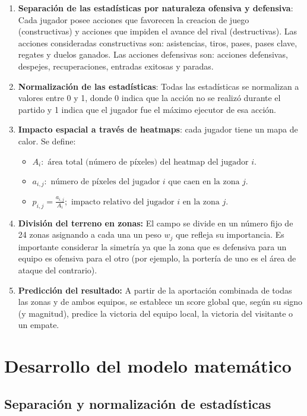 \begin{enumerate}
    \item \textbf{Separación de las estadísticas por naturaleza ofensiva y defensiva}: Cada jugador posee acciones que favorecen la creacion de juego (constructivas) y acciones que impiden el avance del rival (destructivas). Las acciones consideradas constructivas son: asistencias, tiros, pases, pases clave, regates y duelos ganados. Las acciones defensivas son: acciones defensivas, despejes, recuperaciones, entradas exitosas y paradas.
    \item \textbf{Normalización de las estadísticas}: Todas las estadísticas se normalizan a valores entre 0 y 1, donde 0 indica que la acción no se realizó durante el partido y 1 indica que el jugador fue el máximo ejecutor de esa acción.
    \item \textbf{Impacto espacial a través de heatmaps}: cada jugador tiene un mapa de calor. Se define:
    \begin{itemize}
        \item $ A_i: \text{ área total (número de píxeles) del heatmap del jugador } i.$
        \item $ a_{i,j}: \text{ número de píxeles del jugador } i \text{ que caen en la zona } j. $
        \item $ p_{i,j} = \frac{a_{i,j}}{A_i}; \text{ impacto relativo del jugador } i \text{ en la zona } j. $
    \end{itemize} 

    \item \textbf{División del terreno en zonas:} El campo se divide en un número fijo de 24 zonas asignando a cada una un peso $w_j$ que refleja su importancia. Es importante 
    considerar la simetría ya que la zona que es defensiva para un equipo es ofensiva para el otro (por ejemplo, la portería de uno es el área de ataque del contrario).
    \item \textbf{Predicción del resultado:} A partir de la aportación combinada de todas las zonas y de ambos equipos, se establece un score global que, según su signo (y magnitud),
    predice la victoria del equipo local, la victoria del visitante o un empate.

\end{enumerate}

\section{Desarrollo del modelo matemático}
\subsection*{Separación y normalización de estadísticas}


